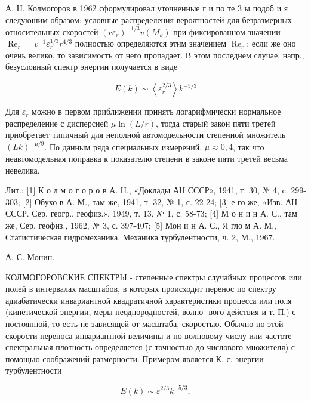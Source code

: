 \documentclass[10pt]{article}
\begin{document}
А. Н. Колмогоров в 1962 сформулировал уточненные г и по те 3 ы подоб и я следуюшим образом: условные распределения вероятностей для безразмерных относительных скоростей $\left(r \varepsilon_{r}\right)^{-1 / 3} v\left(M_{k}\right)$ при фиксированном значении $\operatorname{Re}_{r}=v^{-1} \varepsilon_{r}^{1 / 3} r^{4 / 3}$ полностью определяются этим значением $\operatorname{Re}_{r}$; если же оно очень велико, то зависимость от него пропадает. В этом последнем случае, напр., безусловный спектр энергии получается в виде



\[

E(k) \sim\left\langle\varepsilon_{r}^{2 / 3}\right\rangle k^{-5 / 3}

\]



Для $\varepsilon_{r}$ можно в первом приближении принять логарифмически нормальное распределение с дисперсией $\mu \ln (L / r)$, тогда старый закон пяти третей приобретает типичный для неполной автомодельности степенной множитель $(L k)^{-\mu / 9}$. По данным ряда специальных измерений, $\mu \approx 0,4$, так что неавтомодельная поправка к показателю степени в законе пяти третей весьма невелика.



Лит.: [1] К о л м о г о р о в А. Н., «Доклады АН СССР», 1941, т. 30, № 4, c. 299-303; [2] Обухо в А. М., там же, 1941, т. 32, № 1, с. 22-24; [3] е го же, «Изв. АН СССР. Сер. геогр., геофиз.», 1949, т. 13, № 1, с. 58-73; [4] М о н и н А. С., там же, Сер. геофиз., 1962, № 3, с. 397-407; [5] Мон и н А. С., Я гло м А. М., Статистическая гидромеханика. Механика турбулентности, ч. 2, М., 1967.



А. С. Монин.



КОЛМОГОРОВСКИЕ СПЕКТРЫ - степенные спектры случайных процессов или полей в интервалах масштабов, в которых происходит перенос по спектру адиабатически инвариантной квадратичной характеристики процесса или поля (кинетической энергии, меры неоднородностей, волно- вого действия и т. П.) с постоянной, то есть не зависящей от масштаба, скоростью. Обычно по этой скорости переноса инвариантной величины и по волновому числу или частоте спектральная плотность определяется (с точностью до числового множителя) с помощью соображений размерности. Примером является К. с. энергии турбулентности



\[

E(k) \sim \varepsilon^{2 / 3} k^{-5 / 3},

\]
\end{document}
